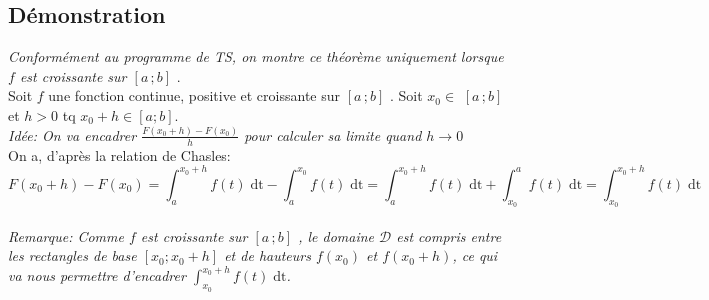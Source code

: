 \documentclass[12px]{article}
\newcommand\I{$[a\,;b]$ }
\newcommand\xo{x_{0} }
\newcommand\dt{f(t)\;\mathrm{dt}}
\begin{document}
	\subsection{Démonstration}
	\emph{Conformément au programme de TS, on montre ce théorème uniquement lorsque $f$ est croissante sur \I}.\\
	
	Soit $f$ une fonction continue, positive et croissante sur \I.
	Soit $\xo \in$ \I et $h>0$ tq $\xo+h \in [a;b]$.\\
	
	\emph{Idée: On va encadrer $\frac{F( \xo +h) - F(\xo) }{h}$ pour calculer sa limite quand $h \rightarrow 0$}\\
		
	On a, d'après la relation de Chasles:\\
	\begin{displaymath}
		F( \xo +h ) - F(\xo) = \int_{a}^{\xo +h}\dt - \int_{a}^{\xo}\dt = 
		\int_{a}^{ \xo +h }\dt + \int_{\xo}^{a}\dt = \int_{\xo}^{\xo +h}\dt
	\end{displaymath}
	\\
		
	\emph
	{
	Remarque: Comme $f$ est croissante sur \I, le domaine $\mathcal{D}$ est compris entre les rectangles de base $[\xo; \xo +h]$ et de hauteurs $f(\xo)$ et $f(\xo +h)$, ce qui va nous permettre d'encadrer $\int_{\xo}^{\xo +h}\dt$.
	}
	
\end{document}
